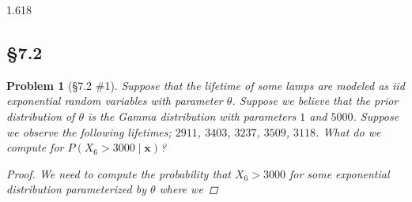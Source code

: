 \documentclass[11pt, oneside]{book}   	%
\newtheorem{problem}{Problem}[section]
\begin{document}
\begin{spacing}{1.618}
		\subsection{\S 7.2}
		
			\begin{problem}[\S 7.2 \#1]
				Suppose that the lifetime of some lamps are modeled as iid exponential random variables with parameter $\theta$. Suppose we believe that the prior distribution of $\theta$ is the Gamma distribution with parameters $1$ and $5000$. Suppose we observe the following lifetimes; $2911$, $3403$, $3237$, $3509$, $3118$. What do we compute for $P(X_6 > 3000\mid \mathbf{x})$? 
				\begin{proof}
					We need to compute the probability that $X_6 > 3000$ for some exponential distribution parameterized by $\theta$ where we 
				\end{proof}
			\end{problem}


\printindex
\end{spacing}
\end{document}

